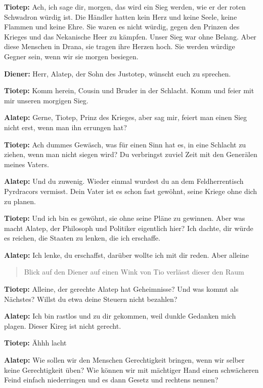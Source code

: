 \documentclass[a5paper,6pt]{book}
\begin{document}
\textbf{Tiotep:} Ach, ich sage dir, morgen, das wird ein Sieg werden, wie er der roten Schwadron
würdig ist. Die Händler hatten kein Herz und keine Seele, keine Flammen und keine
Ehre. Sie waren es nicht würdig, gegen den Prinzen des Krieges und das Nekanische
Heer zu kämpfen. Unser Sieg war ohne Belang. Aber diese Menschen in Drana, sie
tragen ihre Herzen hoch. Sie werden würdige Gegner sein, wenn wir sie morgen
besiegen.

\textbf{Diener:} Herr, Alatep, der Sohn des Justotep, wünscht euch zu sprechen.

\textbf{Tiotep:} Komm herein, Cousin und Bruder in der Schlacht. Komm und feier mit mir unseren
morgigen Sieg.

\textbf{Alatep:} Gerne, Tiotep, Prinz des Krieges, aber sag mir, feiert man einen Sieg nicht erst, wenn
man ihn errungen hat?

\textbf{Tiotep:} Ach dummes Gewäsch, was für einen Sinn hat es, in eine Schlacht zu ziehen, wenn
man nicht siegen wird? Du verbringst zuviel Zeit mit den Generälen meines Vaters.

\textbf{Alatep:} Und du zuwenig. Wieder einmal wurdest du an dem Feldherrentisch Pyrdracors
vermisst. Dein Vater ist es schon fast gewöhnt, seine Kriege ohne dich zu planen.

\textbf{Tiotep:} Und ich bin es gewöhnt, sie ohne seine Pläne zu gewinnen. Aber was macht Alatep,
der Philosoph und Politiker eigentlich hier? Ich dachte, dir würde es reichen, die
Staaten zu lenken, die ich erschaffe.

\textbf{Alatep:} Ich lenke, du erschaffst, darüber wollte ich mit dir reden. Aber alleine

\begin{quote}
Blick auf den Diener auf einen Wink von Tio verlässt dieser den Raum
\end{quote} 

\textbf{Tiotep:} Alleine, der gerechte Alatep hat Geheimnisse? Und was kommt als Nächstes? Willst
du etwa deine Steuern nicht bezahlen?

\textbf{Alatep:} Ich bin rastlos und zu dir gekommen, weil dunkle Gedanken mich plagen. Dieser
Kireg ist nicht gerecht.

\textbf{Tiotep:} Ähhh lacht

\textbf{Alatep:} Wie sollen wir den Menschen Gerechtigkeit bringen, wenn wir selber keine
Gerechtigkeit üben? Wie können wir mit mächtiger Hand einen schwächeren Feind
einfach niederringen und es dann Gesetz und rechtens nennen?
\end{document}
